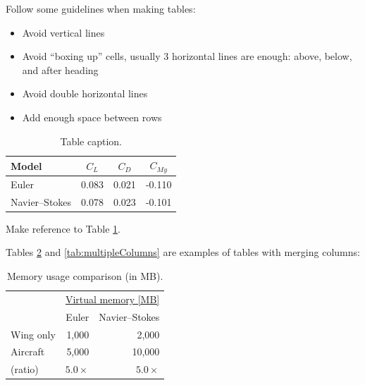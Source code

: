 Follow some guidelines when making tables:

\begin{itemize}
  \item Avoid vertical lines
  \item Avoid “boxing up” cells, usually 3 horizontal lines are enough: above, below, and after heading
  \item Avoid double horizontal lines
  \item Add enough space between rows
\end{itemize}

\begin{table}[!htb]
  \renewcommand{\arraystretch}{1.2} %
  \centering
  \begin{tabular}{lccc}
    \toprule
    Model           & $C_L$ & $C_D$ & $C_{M y}$ \\
    \midrule
    Euler           & 0.083 & 0.021 & -0.110    \\
    Navier--Stokes  & 0.078 & 0.023 & -0.101    \\
    \bottomrule
  \end{tabular}
  \caption[Table caption shown in TOC.]{Table caption.}
  \label{tab:aeroCoeff}
\end{table}

Make reference to Table \ref{tab:aeroCoeff}.

Tables \ref{tab:memory} and \ref{tab:multipleColumns} are examples of tables with merging columns:

\begin{table}[!htb]
  \renewcommand{\arraystretch}{1.2} %
  \centering
  \begin{tabular}[]{lrr}
    \toprule
                & \multicolumn{2}{c}{\underline{Virtual memory [MB]}} \\
                & Euler       & Navier--Stokes \\
    \midrule
      Wing only &  1,000      &    2,000       \\
      Aircraft  &  5,000      &   10,000       \\
      (ratio)   & $5.0\times$ & $5.0\times$    \\
    \bottomrule
  \end{tabular}
  \caption{Memory usage comparison (in MB).}
  \label{tab:memory}
\end{table}

